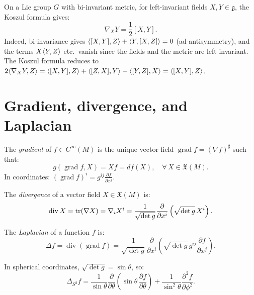 \begin{example}
\label{ex:bi_inv_christoffel}
On a Lie group $G$ with bi-invariant metric, for left-invariant fields
$X, Y \in \mathfrak{g}$, the Koszul formula gives:
\[
    \nabla_X Y = \frac{1}{2}[X, Y].
\]
Indeed, bi-invariance gives $\langle [X,Y], Z \rangle + \langle Y, [X,Z] \rangle = 0$
(ad-antisymmetry), and the terms $X\langle Y, Z \rangle$ etc.\ vanish since the
fields and the metric are left-invariant. The Koszul formula reduces to
$2\langle \nabla_X Y, Z \rangle = \langle [X,Y], Z \rangle + \langle [Z,X], Y \rangle - \langle [Y,Z], X \rangle
= \langle [X,Y], Z \rangle$.
\end{example}

\section{Gradient, divergence, and Laplacian}

\begin{definition}[Gradient]
The \emph{gradient} of $f \in C^\infty(M)$ is the unique vector field
$\operatorname{grad} f = (\nabla f)^\sharp$ such that:
\[
    g(\operatorname{grad} f, X) = Xf = df(X), \quad \forall\, X \in \mathfrak{X}(M).
\]
In coordinates: $(\operatorname{grad} f)^i = g^{ij} \frac{\partial f}{\partial x^j}$.
\end{definition}

\begin{definition}[Divergence]
The \emph{divergence} of a vector field $X \in \mathfrak{X}(M)$ is:
\[
    \operatorname{div} X = \mathrm{tr}(\nabla X) = \nabla_i X^i
    = \frac{1}{\sqrt{\det g}} \frac{\partial}{\partial x^i}
    \left(\sqrt{\det g}\, X^i\right).
\]
\end{definition}

\begin{definition}
The \emph{Laplacian} of a function $f$ is:
\[
    \Delta f = \operatorname{div}(\operatorname{grad} f)
    = \frac{1}{\sqrt{\det g}} \frac{\partial}{\partial x^i}
    \left(\sqrt{\det g}\, g^{ij} \frac{\partial f}{\partial x^j}\right).
\]
\end{definition}

\begin{example}[Laplacian on $S^2$]
In spherical coordinates, $\sqrt{\det g} = \sin\theta$, so:
\[
    \Delta_{S^2} f = \frac{1}{\sin\theta}\frac{\partial}{\partial\theta}
    \left(\sin\theta\, \frac{\partial f}{\partial\theta}\right)
    + \frac{1}{\sin^2\!\theta}\frac{\partial^2 f}{\partial\phi^2}.
\]
\end{example}

